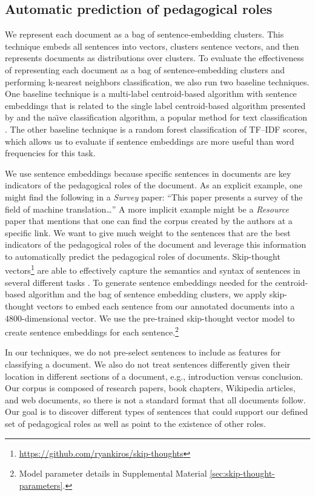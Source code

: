 \documentclass[11pt,a4paper]{article}
\begin{document}
\subsection{Automatic prediction of pedagogical roles}
We represent each document as a bag of sentence-embedding clusters. This technique embeds all sentences into vectors, clusters sentence vectors, and then represents documents as distributions over clusters. To evaluate the effectiveness of representing each document as a bag of sentence-embedding clusters and performing k-nearest neighbors classification, we also run two baseline techniques. One baseline technique is a multi-label centroid-based algorithm with sentence embeddings that is related to the single label centroid-based algorithm presented by  and the na\"\i ve  classification algorithm, a popular method for text classification \cite{rogati2002high}. The other baseline technique is a random forest classification of TF--IDF scores, which allows us to evaluate if sentence embeddings are more useful than word frequencies for this task. 

We use sentence embeddings because specific sentences in documents are key indicators of the pedagogical roles of the document. As an explicit example, one might find the following in a \textit{Survey} paper: ``This paper presents a survey of the field of machine translation\ldots'' A more implicit example might be a \textit{Resource} paper that mentions that one can find the corpus created by the authors at a specific link. We want to give much weight to the sentences that are the best indicators of the pedagogical roles of the document and leverage this information to automatically predict the pedagogical roles of documents. Skip-thought vectors\footnote{\url{https://github.com/ryankiros/skip-thoughts}} are able to effectively capture the semantics and syntax of sentences in several different tasks \cite{kiros2015skip}. To generate sentence embeddings needed for the centroid-based algorithm and the bag of sentence embedding clusters, we apply skip-thought vectors to embed each sentence from our annotated documents into a 4800-dimensional vector. We use the pre-trained skip-thought vector model to create sentence embeddings for each sentence.\footnote{Model parameter details in Supplemental Material \ref{sec:skip-thought-parameters}.}

In our techniques, we do not pre-select sentences to include as features for classifying a document. We also do not treat sentences differently given their location in different sections of a document, e.g., introduction versus conclusion. Our corpus is composed of research papers, book chapters, Wikipedia articles, and web documents, so there is not a standard format that all documents follow. Our goal is to discover different types of sentences that could support our defined set of pedagogical roles as well as point to the existence of other roles.
\end{document}
